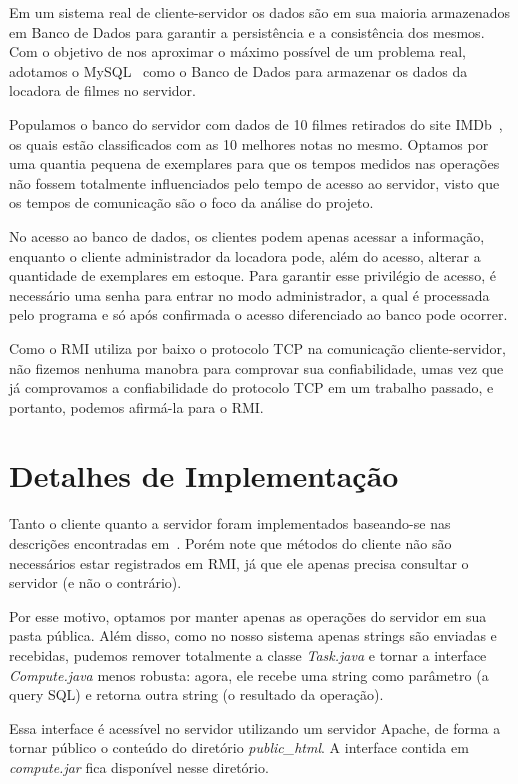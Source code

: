 \documentclass[12pt,a4paper]{article}
\begin{document}
Em um sistema real de cliente-servidor os dados são em sua maioria armazenados em Banco de Dados para garantir a persistência e a consistência dos mesmos. Com o objetivo de nos aproximar o máximo possível de um problema real, adotamos o MySQL~\cite{mysql1995mysql} como o Banco de Dados para armazenar os dados da locadora de filmes no servidor.

    Populamos o banco do servidor com dados de 10 filmes retirados do site IMDb~\cite{IMDbsite}, os quais estão classificados com as 10 melhores notas no mesmo. Optamos por uma quantia pequena de exemplares para que os tempos medidos nas operações não fossem totalmente influenciados pelo tempo de acesso ao servidor, visto que os tempos de comunicação são o foco da análise do projeto.
    
    No acesso ao banco de dados, os clientes podem apenas acessar a informação, enquanto o cliente administrador da locadora pode, além do acesso, alterar a quantidade de exemplares em estoque. Para garantir esse privilégio de acesso, é necessário uma senha para entrar no modo administrador, a qual é processada pelo programa e só após confirmada o acesso diferenciado ao banco pode ocorrer.
    
Como o RMI utiliza por baixo o protocolo TCP na comunicação cliente-servidor, não fizemos nenhuma manobra para comprovar sua confiabilidade, umas vez que já comprovamos a confiabilidade do protocolo TCP em um trabalho passado, e portanto, podemos afirmá-la para o RMI.

\section{Detalhes de Implementação}

Tanto o cliente quanto a servidor foram implementados baseando-se nas descrições encontradas em~\cite{RMITutorial}. Porém note que métodos do cliente não são necessários estar registrados em RMI, já que ele apenas precisa consultar o servidor (e não o contrário).

Por esse motivo, optamos por manter apenas as operações do servidor em sua pasta pública. Além disso, como no nosso sistema apenas strings são enviadas e recebidas, pudemos remover totalmente a classe {\it Task.java} e tornar a interface {\it Compute.java} menos robusta: agora, ele recebe uma string como parâmetro (a query SQL) e retorna outra string (o resultado da operação).

Essa interface é acessível no servidor utilizando um servidor Apache, de forma a tornar público o conteúdo do diretório {\it public\_html}. A interface contida em {\it compute.jar} fica disponível nesse diretório.
\end{document}
